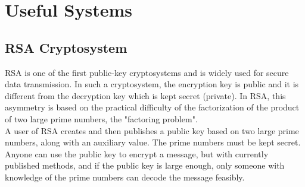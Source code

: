 \documentclass[12pt]{report}
\begin{document}

\chapter{Useful Systems}
\section{RSA Cryptosystem}
RSA is one of the first public-key cryptosystems and is widely used for secure data transmission. In such a cryptosystem, the encryption key is public and it is different from the decryption key which is kept secret (private). In RSA, this asymmetry is based on the practical difficulty of the factorization of the product of two large prime numbers, the "factoring problem". 
\\
A user of RSA creates and then publishes a public key based on two large prime numbers, along with an auxiliary value. The prime numbers must be kept secret. Anyone can use the public key to encrypt a message, but with currently published methods, and if the public key is large enough, only someone with knowledge of the prime numbers can decode the message feasibly.
\end{document}
